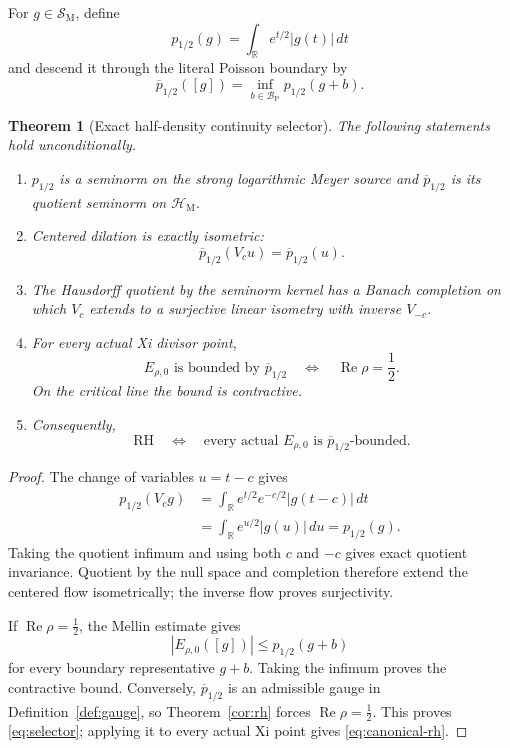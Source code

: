\documentclass[11pt]{article}
\newtheorem{theorem}{Theorem}[section]
\theoremstyle{definition}
\theoremstyle{remark}
\newcommand{\R}{\mathbb R}
\newcommand{\cB}{\mathcal B}
\newcommand{\cH}{\mathcal H}
\newcommand{\cS}{\mathcal S}
\newcommand{\Rea}{\operatorname{Re}}
\begin{document}
For \(g\in\cS_{\mathrm M}\), define
\[
 p_{1/2}(g)=\int_{\R}e^{t/2}|g(t)|\,dt
\tag{7.9}\label{eq:half-density}
\]
and descend it through the literal Poisson boundary by
\[
 \overline p_{1/2}([g])
   =\inf_{b\in\cB_{\mathrm P}}p_{1/2}(g+b).
\tag{7.10}\label{eq:quotient-half-density}
\]

\begin{theorem}[Exact half-density continuity selector]
\label{thm:half-density}
The following statements hold unconditionally.
\begin{enumerate}[label=\textup{(\roman*)},leftmargin=2em]
\item \(p_{1/2}\) is a seminorm on the strong logarithmic Meyer source and
      \(\overline p_{1/2}\) is its quotient seminorm on
      \(\cH_{\mathrm M}\).
\item Centered dilation is exactly isometric:
      \[
                  \overline p_{1/2}(V_cu)=\overline p_{1/2}(u).
      \]
\item The Hausdorff quotient by the seminorm kernel has a Banach
      completion on which \(V_c\) extends to a surjective linear isometry
      with inverse \(V_{-c}\).
\item For every actual Xi divisor point,
      \[
      E_{\rho,0}\text{ is bounded by }\overline p_{1/2}
      \quad\Longleftrightarrow\quad
      \Rea\rho=\frac12.
      \tag{7.11}\label{eq:selector}
      \]
      On the critical line the bound is contractive.
\item Consequently,
      \[
      \mathrm{RH}
      \quad\Longleftrightarrow\quad
      \text{every actual \(E_{\rho,0}\) is
      \(\overline p_{1/2}\)-bounded}.
      \tag{7.12}\label{eq:canonical-rh}
      \]
\end{enumerate}
\end{theorem}

\begin{proof}
The change of variables \(u=t-c\) gives
\[
\begin{aligned}
p_{1/2}(V_cg)
 &=\int_{\R}e^{t/2}e^{-c/2}|g(t-c)|\,dt\\
 &=\int_{\R}e^{u/2}|g(u)|\,du=p_{1/2}(g).
\end{aligned}
\]
Taking the quotient infimum and using both \(c\) and \(-c\) gives exact
quotient invariance.  Quotient by the null space and completion therefore
extend the centered flow isometrically; the inverse flow proves
surjectivity.

If \(\Rea\rho=\tfrac12\), the Mellin estimate gives
\[
 |E_{\rho,0}([g])|
 \le p_{1/2}(g+b)
\]
for every boundary representative \(g+b\).  Taking the infimum proves
the contractive bound.  Conversely, \(\overline p_{1/2}\) is an admissible
gauge in Definition~\ref{def:gauge}, so Theorem~\ref{cor:rh} forces
\(\Rea\rho=\tfrac12\).  This proves \eqref{eq:selector}; applying it to
every actual Xi point gives \eqref{eq:canonical-rh}.
\end{proof}
\end{document}
